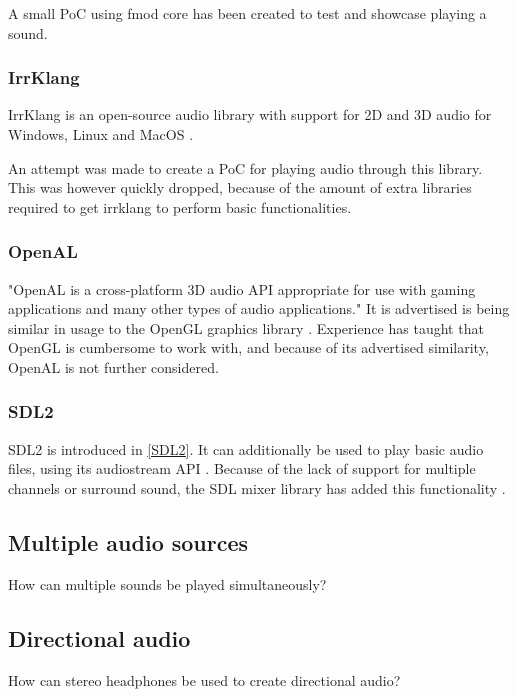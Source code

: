A small PoC using fmod core has been created to test and showcase playing a sound.

\subsubsection{IrrKlang}
IrrKlang is an open-source audio library with support for 2D and 3D audio for Windows, Linux and MacOS \cite{IrrKlang}.

An attempt was made to create a PoC for playing audio through this library. This was however quickly dropped, because of the amount of extra libraries required to get irrklang to perform basic functionalities.

\subsubsection{OpenAL}
"OpenAL is a cross-platform 3D audio API appropriate for use with gaming applications and many other types of audio applications." It is advertised is being similar in usage to the OpenGL graphics library \cite{OpenAL}.
Experience has taught that OpenGL is cumbersome to work with, and because of its advertised similarity, OpenAL is not further considered.

\subsubsection{SDL2}
SDL2 is introduced in \ref{SDL2}. It can additionally be used to play basic audio files, using its audiostream API \cite{SDLaudioStream}.
Because of the lack of support for multiple channels or surround sound, the SDL mixer library has added this functionality \cite{SDLmixer}.

\subsection{Multiple audio sources}
How can multiple sounds be played simultaneously?
\subsection{Directional audio}
How can stereo headphones be used to create directional audio?
